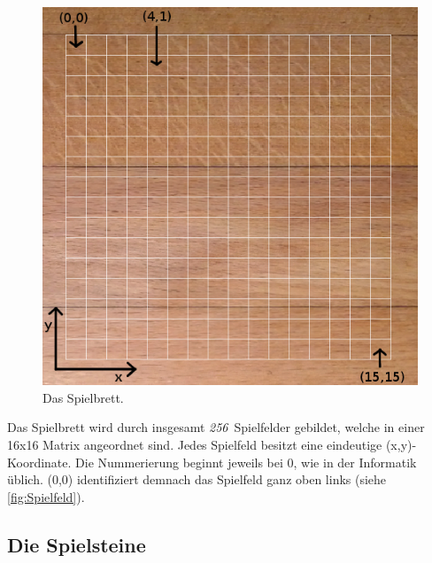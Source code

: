\documentclass[a4paper, ngerman]{scrartcl}
\newcommand{\SpielFelderAnzahl}{\emph{256}}
\begin{document}
\begin{figure}[h] \centering 
	\includegraphics[scale = 0.25]{images/Spielbrett}
	\caption{Das Spielbrett.}
	\label{fig:Spielfeld}
\end{figure}
Das Spielbrett wird durch insgesamt \SpielFelderAnzahl\ Spielfelder gebildet, welche in einer 16x16 Matrix angeordnet sind.  Jedes Spielfeld besitzt eine eindeutige (x,y)-Koordinate. Die Nummerierung beginnt jeweils bei 0, wie in der Informatik üblich. (0,0) identifiziert demnach das Spielfeld ganz  oben links (siehe \autoref{fig:Spielfeld}).\\

\subsection{Die Spielsteine}
\end{document}
